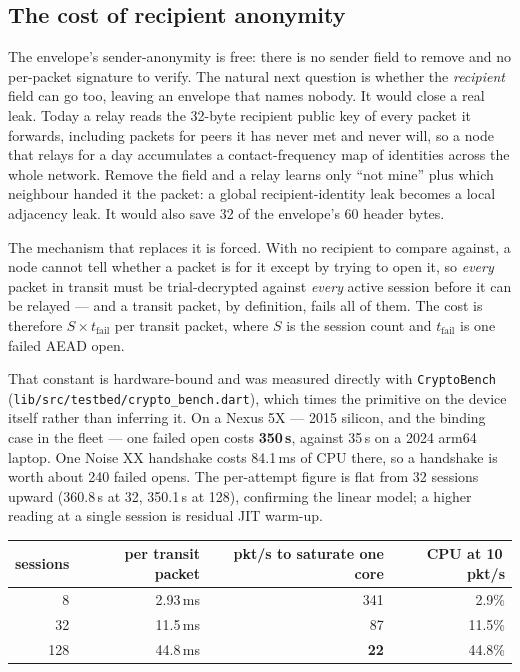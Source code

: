 \documentclass[11pt]{report}
\newcommand{\code}[1]{\texttt{\small #1}}
\begin{document}
\subsection{The cost of recipient anonymity}

The envelope's sender-anonymity is free: there is no sender field to remove and no per-packet signature to verify. The natural next question is whether the \emph{recipient} field can go too, leaving an envelope that names nobody. It would close a real leak. Today a relay reads the 32-byte recipient public key of every packet it forwards, including packets for peers it has never met and never will, so a node that relays for a day accumulates a contact-frequency map of identities across the whole network. Remove the field and a relay learns only ``not mine'' plus which neighbour handed it the packet: a global recipient-identity leak becomes a local adjacency leak. It would also save 32 of the envelope's 60 header bytes.

The mechanism that replaces it is forced. With no recipient to compare against, a node cannot tell whether a packet is for it except by trying to open it, so \emph{every} packet in transit must be trial-decrypted against \emph{every} active session before it can be relayed --- and a transit packet, by definition, fails all of them. The cost is therefore $S \times t_\text{fail}$ per transit packet, where $S$ is the session count and $t_\text{fail}$ is one failed AEAD open.

That constant is hardware-bound and was measured directly with \code{CryptoBench} (\code{lib/src/testbed/crypto\_bench.dart}), which times the primitive on the device itself rather than inferring it. On a Nexus 5X --- 2015 silicon, and the binding case in the fleet --- one failed open costs \textbf{350\,\textmu s}, against 35\,\textmu s on a 2024 arm64 laptop. One Noise XX handshake costs 84.1\,ms of CPU there, so a handshake is worth about 240 failed opens. The per-attempt figure is flat from 32 sessions upward (360.8\,\textmu s at 32, 350.1\,\textmu s at 128), confirming the linear model; a higher reading at a single session is residual JIT warm-up.

\begin{center}
\begin{tabular}{rrrr}
\toprule
sessions & per transit packet & pkt/s to saturate one core & CPU at 10\,pkt/s \\
\midrule
8   & 2.93\,ms  & 341 & 2.9\% \\
32  & 11.5\,ms  & 87  & 11.5\% \\
128 & 44.8\,ms  & \textbf{22}  & 44.8\% \\
\bottomrule
\end{tabular}
\end{center}
\end{document}
